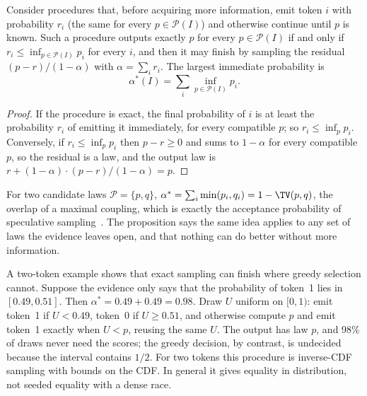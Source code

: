 \begin{proposition}\label{prop:commonmass}
Consider procedures that, before acquiring more information, emit token $i$ with probability $r_i$ (the same for every $p\in\mathcal P(I)$) and otherwise continue until $p$ is known. Such a procedure outputs exactly $p$ for every $p\in\mathcal P(I)$ if and only if $r_i\le\inf_{p\in\mathcal P(I)}p_i$ for every $i$, and then it may finish by sampling the residual $(p-r)/(1-\alpha)$ with $\alpha=\sum_ir_i$. The largest immediate probability is
\[\alpha^\ast(I)=\sum_i\inf_{p\in\mathcal P(I)}p_i.\]
\end{proposition}
\begin{proof}
If the procedure is exact, the final probability of $i$ is at least the probability $r_i$ of emitting it immediately, for every compatible $p$; so $r_i\le\inf_pp_i$. Conversely, if $r_i\le\inf_pp_i$ then $p-r\ge0$ and sums to $1-\alpha$ for every compatible $p$, so the residual is a law, and the output law is $r+(1-\alpha)\cdot(p-r)/(1-\alpha)=p$.
\end{proof}
For two candidate laws $\mathcal P=\{p,q\}$, $\alpha^\ast=\sum_i\min(p_i,q_i)=1-\TV(p,q)$, the overlap of a maximal coupling, which is exactly the acceptance probability of speculative sampling~\cite{specdecode,chen2023specsampling}. The proposition says the same idea applies to any set of laws the evidence leaves open, and that nothing can do better without more information.

A two-token example shows that exact sampling can finish where greedy selection cannot. Suppose the evidence only says that the probability of token~1 lies in $[0.49,0.51]$. Then $\alpha^\ast=0.49+0.49=0.98$. Draw $U$ uniform on $[0,1)$: emit token~1 if $U<0.49$, token~0 if $U\ge0.51$, and otherwise compute $p$ and emit token~1 exactly when $U<p$, reusing the same $U$. The output has law $p$, and 98\% of draws never need the scores; the greedy decision, by contrast, is undecided because the interval contains $1/2$. For two tokens this procedure is inverse-CDF sampling with bounds on the CDF. In general it gives equality in distribution, not seeded equality with a dense race.

